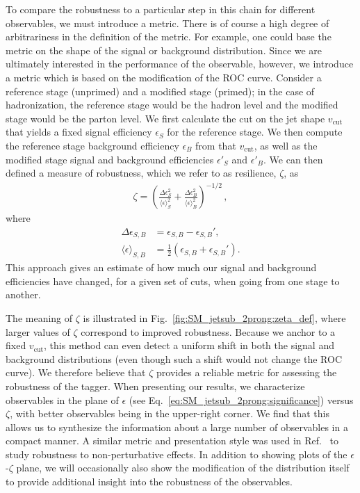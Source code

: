 To compare the robustness to a
particular step in this chain for different observables, we must
introduce a metric.
%
There is of course a high degree of arbitrariness
in the definition of the metric.
%
For example, one could base the metric on the shape of the signal or background distribution.
%
Since we are ultimately interested in the performance of the observable, however, we introduce a metric which is based on the modification of the ROC curve.
%
Consider a reference stage (unprimed) and a modified stage (primed); in the case of hadronization, the reference stage would be the hadron level and the modified stage would be the parton level.
%
We first calculate the cut on the jet shape $v_{\text{cut}}$ that yields a fixed signal efficiency $\epsilon_S$ for the reference stage.
%
We then compute the reference stage background efficiency $\epsilon_B$ from that $v_{\text{cut}}$, as well as the modified stage signal and background efficiencies $\epsilon'_S$ and $\epsilon'_B$.
%
We can then defined a measure of robustness, which we refer to as resilience, $\zeta$, as
%
\begin{align}
\zeta=\left(  \frac{\Delta \epsilon_S^2}{ \langle \epsilon \rangle_S^2}  +\frac{\Delta \epsilon_B^2}{ \langle \epsilon \rangle_B^2}  \right)^{-1/2}\,,
\end{align}
%
where
%
\begin{align}
\Delta \epsilon_{S,B} & =\epsilon_{S,B}-\epsilon_{S,B}',\\
\langle \epsilon \rangle_{S,B} & = \frac{1}{2} \left(\epsilon_{S,B} + \epsilon_{S,B}'\right).
\end{align}
%
This approach gives an estimate of how much our signal and background efficiencies have changed, for a given set of cuts, when going from one stage to another.

The meaning of $\zeta$ is illustrated in Fig.~\ref{fig:SM_jetsub_2prong:zeta_def}, where larger values of $\zeta$ correspond to improved robustness.
%
Because we anchor to a fixed $v_{\text{cut}}$, this method can even detect a uniform shift in both the signal and background distributions (even though such a shift would not change the ROC curve).
%
We therefore believe that $\zeta$ provides a reliable metric for assessing the robustness of the tagger.
%
When presenting our results, we characterize observables
in the plane of $\epsilon$ (see Eq.~\eqref{eq:SM_jetsub_2prong:significance}) versus $\zeta$, with better observables being in
the upper-right corner.
%
We find that this allows us to synthesize the
information about a large number of observables in a compact manner.
%
A
similar metric and presentation style was used in Ref.~\cite{Dasgupta:2016ktv,Salam:2016yht}
to study robustness to non-perturbative effects.
%
In addition to
showing plots of the $\epsilon$-$\zeta$ plane, we will occasionally also show the modification of the distribution
itself to provide additional insight into the robustness of the
observables.

